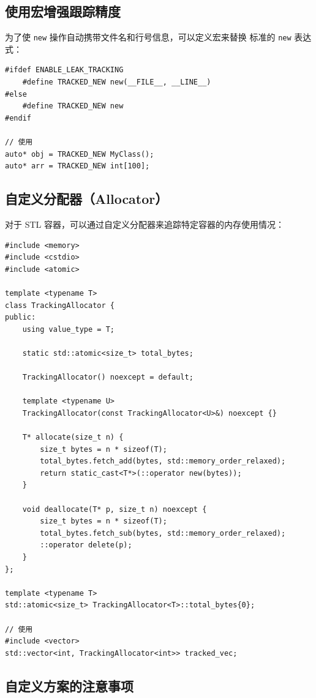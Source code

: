 \documentclass[12pt,a4paper,fontset=fandol]{ctexbook}
\begin{document}
\subsection{使用宏增强跟踪精度}

为了使 \texttt{new} 操作自动携带文件名和行号信息，可以定义宏来替换
标准的 \texttt{new} 表达式：

\begin{lstlisting}[style=cppstyle, caption={追踪宏定义}]
#ifdef ENABLE_LEAK_TRACKING
    #define TRACKED_NEW new(__FILE__, __LINE__)
#else
    #define TRACKED_NEW new
#endif

// 使用
auto* obj = TRACKED_NEW MyClass();
auto* arr = TRACKED_NEW int[100];
\end{lstlisting}

\subsection{自定义分配器（Allocator）}

对于 STL 容器，可以通过自定义分配器来追踪特定容器的内存使用情况：

\begin{lstlisting}[style=cppstyle, caption={自定义 STL 分配器}]
#include <memory>
#include <cstdio>
#include <atomic>

template <typename T>
class TrackingAllocator {
public:
    using value_type = T;

    static std::atomic<size_t> total_bytes;

    TrackingAllocator() noexcept = default;

    template <typename U>
    TrackingAllocator(const TrackingAllocator<U>&) noexcept {}

    T* allocate(size_t n) {
        size_t bytes = n * sizeof(T);
        total_bytes.fetch_add(bytes, std::memory_order_relaxed);
        return static_cast<T*>(::operator new(bytes));
    }

    void deallocate(T* p, size_t n) noexcept {
        size_t bytes = n * sizeof(T);
        total_bytes.fetch_sub(bytes, std::memory_order_relaxed);
        ::operator delete(p);
    }
};

template <typename T>
std::atomic<size_t> TrackingAllocator<T>::total_bytes{0};

// 使用
#include <vector>
std::vector<int, TrackingAllocator<int>> tracked_vec;
\end{lstlisting}

\subsection{自定义方案的注意事项}
\end{document}
